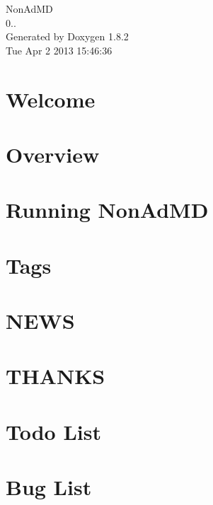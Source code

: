 \documentclass{book}
\begin{document}
\hypersetup{pageanchor=false,citecolor=blue}
\begin{titlepage}
\vspace*{7cm}
\begin{center}
{\Large Non\-Ad\-M\-D \\[1ex]\large 0.. }\\
\vspace*{1cm}
{\large Generated by Doxygen 1.8.2}\\
\vspace*{0.5cm}
{\small Tue Apr 2 2013 15:46:36}\\
\end{center}
\end{titlepage}
\clearemptydoublepage
{}
\tableofcontents
\clearemptydoublepage
{}
\hypersetup{pageanchor=true,citecolor=blue}
\chapter{Welcome}
\label{index}\hypertarget{index}{}
\chapter{Overview}
\label{Overview}
\hypertarget{Overview}{}

\chapter{Running Non\-Ad\-M\-D}
\label{Interface}
\hypertarget{Interface}{}

\chapter{Tags}
\label{Tags}
\hypertarget{Tags}{}

\chapter{N\-E\-W\-S}
\label{NEWS}
\hypertarget{NEWS}{}

\chapter{T\-H\-A\-N\-K\-S}
\label{THANKS}
\hypertarget{THANKS}{}

\chapter{Todo List}
\label{todo}
\hypertarget{todo}{}

\chapter{Bug List}
\label{bug}
\hypertarget{bug}{}

\end{document}
